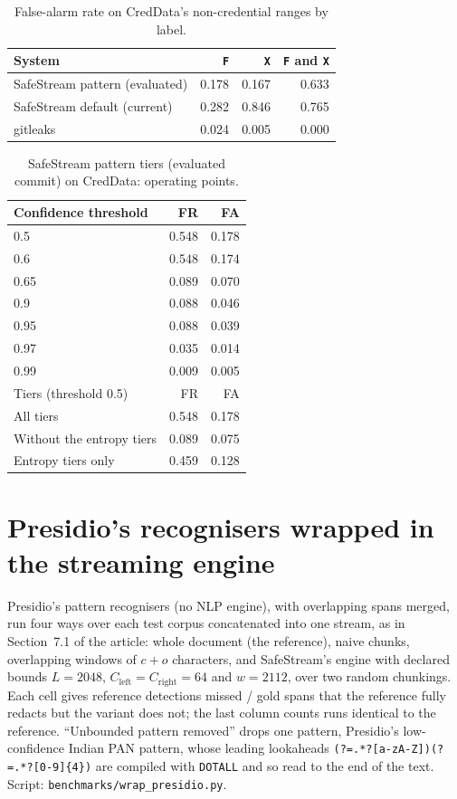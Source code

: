 \documentclass[11pt,a4paper]{article}
\begin{document}
\begin{table}[ht]
\caption{False-alarm rate on CredData's non-credential ranges by label.}\label{t:credfa}
\small
\begin{tabular*}{\textwidth}{@{\extracolsep\fill}lrrr}
\toprule
System & \texttt{F} & \texttt{X} & \texttt{F} and \texttt{X} \\
\midrule
SafeStream pattern (evaluated) & 0.178 & 0.167 & 0.633 \\
SafeStream default (current) & 0.282 & 0.846 & 0.765 \\
gitleaks & 0.024 & 0.005 & 0.000 \\
\bottomrule
\end{tabular*}
\end{table}

\begin{table}[ht]
\caption{SafeStream pattern tiers (evaluated commit) on CredData: operating points.}\label{t:credth}
\small
\begin{tabular*}{\textwidth}{@{\extracolsep\fill}lrr}
\toprule
Confidence threshold & FR & FA \\
\midrule
0.5 & 0.548 & 0.178 \\
0.6 & 0.548 & 0.174 \\
0.65 & 0.089 & 0.070 \\
0.9 & 0.088 & 0.046 \\
0.95 & 0.088 & 0.039 \\
0.97 & 0.035 & 0.014 \\
0.99 & 0.009 & 0.005 \\
\midrule
Tiers (threshold 0.5) & FR & FA \\
\midrule
All tiers & 0.548 & 0.178 \\
Without the entropy tiers & 0.089 & 0.075 \\
Entropy tiers only & 0.459 & 0.128 \\
\bottomrule
\end{tabular*}
\end{table}

\section{Presidio's recognisers wrapped in the streaming engine}\label{s:wrap}

Presidio's pattern recognisers (no NLP engine), with overlapping spans merged, run four ways over each test corpus concatenated into one stream, as in Section~7.1 of the article: whole document (the reference), naive chunks, overlapping windows of $c + o$ characters, and SafeStream's engine with declared bounds $L = 2048$, $C_{\mathrm{left}} = C_{\mathrm{right}} = 64$ and $w = 2112$, over two random chunkings. Each cell gives reference detections missed / gold spans that the reference fully redacts but the variant does not; the last column counts runs identical to the reference. ``Unbounded pattern removed'' drops one pattern, Presidio's low-confidence Indian PAN pattern, whose leading lookaheads \texttt{(?=.*?[a-zA-Z])(?=.*?[0-9]\{4\})} are compiled with \texttt{DOTALL} and so read to the end of the text. Script: \texttt{benchmarks/wrap\_presidio.py}.
\end{document}
